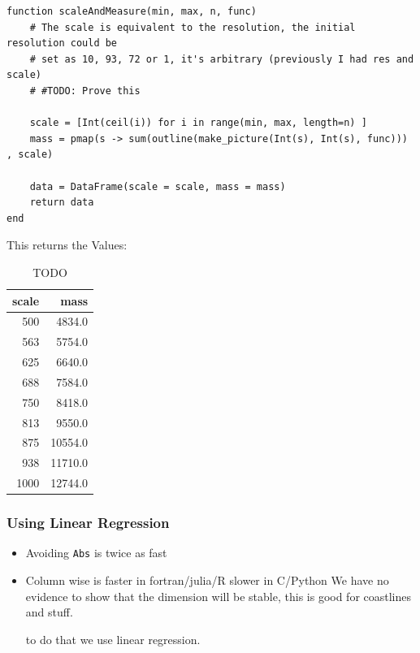 \documentclass[11pt]{article}
\begin{document}
\begin{verbatim}
function scaleAndMeasure(min, max, n, func)
    # The scale is equivalent to the resolution, the initial resolution could be
    # set as 10, 93, 72 or 1, it's arbitrary (previously I had res and scale)
    # #TODO: Prove this

    scale = [Int(ceil(i)) for i in range(min, max, length=n) ]
    mass = pmap(s -> sum(outline(make_picture(Int(s), Int(s), func))) , scale)

    data = DataFrame(scale = scale, mass = mass)
    return data
end

\end{verbatim}

This returns the Values:

\begin{table}[htbp]
\centering
\begin{tabular}{rr}
scale & mass\\
\hline
500 & 4834.0\\
563 & 5754.0\\
625 & 6640.0\\
688 & 7584.0\\
750 & 8418.0\\
813 & 9550.0\\
875 & 10554.0\\
938 & 11710.0\\
1000 & 12744.0\\
\end{tabular}
\caption{\label{table-of-values}TODO}

\end{table}
\subsubsection{Using Linear Regression}
\label{sec:orgef238a3}
\begin{itemize}
\item Avoiding \texttt{Abs} is twice as fast
\item Column wise is faster in fortran/julia/R slower in C/Python
We have no evidence to show that the dimension will be stable, this is good for coastlines and stuff.

to do that we use linear regression.
\end{itemize}
\end{document}
